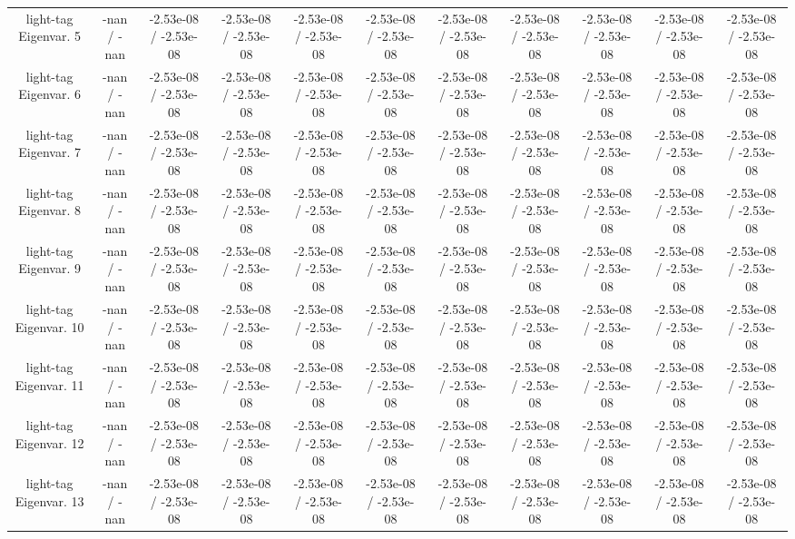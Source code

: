 \begin{table}[htbp]
\begin{center}
\begin{tabular}{|c|c|c|c|c|c|c|c|c|c|c|}
  light-tag Eigenvar. 5 & -nan / -nan & -2.53e-08 / -2.53e-08 & -2.53e-08 / -2.53e-08 & -2.53e-08 / -2.53e-08 & -2.53e-08 / -2.53e-08 & -2.53e-08 / -2.53e-08 & -2.53e-08 / -2.53e-08 & -2.53e-08 / -2.53e-08 & -2.53e-08 / -2.53e-08 & -2.53e-08 / -2.53e-08 \\ 
  light-tag Eigenvar. 6 & -nan / -nan & -2.53e-08 / -2.53e-08 & -2.53e-08 / -2.53e-08 & -2.53e-08 / -2.53e-08 & -2.53e-08 / -2.53e-08 & -2.53e-08 / -2.53e-08 & -2.53e-08 / -2.53e-08 & -2.53e-08 / -2.53e-08 & -2.53e-08 / -2.53e-08 & -2.53e-08 / -2.53e-08 \\ 
  light-tag Eigenvar. 7 & -nan / -nan & -2.53e-08 / -2.53e-08 & -2.53e-08 / -2.53e-08 & -2.53e-08 / -2.53e-08 & -2.53e-08 / -2.53e-08 & -2.53e-08 / -2.53e-08 & -2.53e-08 / -2.53e-08 & -2.53e-08 / -2.53e-08 & -2.53e-08 / -2.53e-08 & -2.53e-08 / -2.53e-08 \\ 
  light-tag Eigenvar. 8 & -nan / -nan & -2.53e-08 / -2.53e-08 & -2.53e-08 / -2.53e-08 & -2.53e-08 / -2.53e-08 & -2.53e-08 / -2.53e-08 & -2.53e-08 / -2.53e-08 & -2.53e-08 / -2.53e-08 & -2.53e-08 / -2.53e-08 & -2.53e-08 / -2.53e-08 & -2.53e-08 / -2.53e-08 \\ 
  light-tag Eigenvar. 9 & -nan / -nan & -2.53e-08 / -2.53e-08 & -2.53e-08 / -2.53e-08 & -2.53e-08 / -2.53e-08 & -2.53e-08 / -2.53e-08 & -2.53e-08 / -2.53e-08 & -2.53e-08 / -2.53e-08 & -2.53e-08 / -2.53e-08 & -2.53e-08 / -2.53e-08 & -2.53e-08 / -2.53e-08 \\ 
  light-tag Eigenvar. 10 & -nan / -nan & -2.53e-08 / -2.53e-08 & -2.53e-08 / -2.53e-08 & -2.53e-08 / -2.53e-08 & -2.53e-08 / -2.53e-08 & -2.53e-08 / -2.53e-08 & -2.53e-08 / -2.53e-08 & -2.53e-08 / -2.53e-08 & -2.53e-08 / -2.53e-08 & -2.53e-08 / -2.53e-08 \\ 
  light-tag Eigenvar. 11 & -nan / -nan & -2.53e-08 / -2.53e-08 & -2.53e-08 / -2.53e-08 & -2.53e-08 / -2.53e-08 & -2.53e-08 / -2.53e-08 & -2.53e-08 / -2.53e-08 & -2.53e-08 / -2.53e-08 & -2.53e-08 / -2.53e-08 & -2.53e-08 / -2.53e-08 & -2.53e-08 / -2.53e-08 \\ 
  light-tag Eigenvar. 12 & -nan / -nan & -2.53e-08 / -2.53e-08 & -2.53e-08 / -2.53e-08 & -2.53e-08 / -2.53e-08 & -2.53e-08 / -2.53e-08 & -2.53e-08 / -2.53e-08 & -2.53e-08 / -2.53e-08 & -2.53e-08 / -2.53e-08 & -2.53e-08 / -2.53e-08 & -2.53e-08 / -2.53e-08 \\ 
  light-tag Eigenvar. 13 & -nan / -nan & -2.53e-08 / -2.53e-08 & -2.53e-08 / -2.53e-08 & -2.53e-08 / -2.53e-08 & -2.53e-08 / -2.53e-08 & -2.53e-08 / -2.53e-08 & -2.53e-08 / -2.53e-08 & -2.53e-08 / -2.53e-08 & -2.53e-08 / -2.53e-08 & -2.53e-08 / -2.53e-08 \\ 

\end{tabular}
\end{center}
\end{table}
